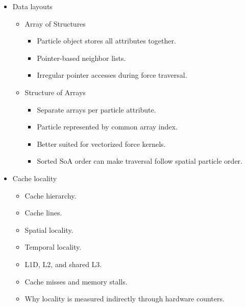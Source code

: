 \begin{itemize}
    \item Data layouts
    \begin{itemize}
        \item Array of Structures
        \begin{itemize}
            \item Particle object stores all attributes together.
            \item Pointer-based neighbor lists.
            \item Irregular pointer accesses during force traversal.
        \end{itemize}
        \item Structure of Arrays
        \begin{itemize}
            \item Separate arrays per particle attribute.
            \item Particle represented by common array index.
            \item Better suited for vectorized force kernels.
            \item Sorted SoA order can make traversal follow spatial particle order.
        \end{itemize}
    \end{itemize}

    \item Cache locality
    \begin{itemize}
        \item Cache hierarchy.
        \item Cache lines.
        \item Spatial locality.
        \item Temporal locality.
        \item L1D, L2, and shared L3.
        \item Cache misses and memory stalls.
        \item Why locality is measured indirectly through hardware counters.
    \end{itemize}


\end{itemize}
